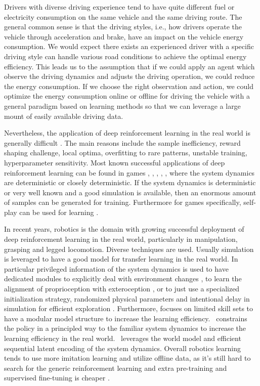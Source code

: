 \documentclass{article}
\begin{document}
Drivers with diverse driving experience tend to have quite different fuel or electricity consumption on the same vehicle and the same driving route. The general common sense is that the driving styles, i.e., how drivers operate the vehicle through acceleration and brake, have an impact on the vehicle energy consumption. We would expect there exists an experienced driver with a specific driving style can handle various road conditions to achieve the optimal energy efficiency. This leads us to the assumption that if we could apply an agent which observe the driving dynamics and adjusts the driving operation, we could reduce the energy consumption. If we choose the right observation and action, we could optimize the energy consumption online or offline for driving the vehicle with a general paradigm based on learning methods so that we can leverage a large mount of easily available driving data.

Nevertheless, the application of deep reinforcement learning in the real world is generally difficult \parencite{DulacArnold_2021_real_world_rl}. The main reasons include the sample inefficiency, reward shaping challenge, local optima, overfitting to rare patterns, unstable training, hyperparameter sensitivity. Most known successful applications of deep reinforcement learning can be found in games \parencite{mnih13:_playin_atari_deep_reinf_learn}, \parencite{DBLP:journals/nature/SilverHMGSDSAPL16}, \parencite{DBLP:conf/ijcai/BrownS17}, \parencite{openai19:_dota_large_scale_deep_reinf_learn}, \parencite{bakhtin22:_Human_level_diplomacy_cicero}, where the system dynamics are deterministic or closely deterministic.
If the system dynamics is deterministic or very well known and a good simulation is available, then an enormous amount of samples can be generated for training. Furthermore for games specifically, self-play can be used for learning \parencite{Silver_2018}.

In recent years, robotics is the domain with growing successful deployment of deep reinforcement learning in the real world, particularly in manipulation, grasping and legged locomotion. Diverse techniques are used. Usually simulation is leveraged to have a good model for transfer learning in the real world. In particular privileged information of the system dynamics is used to have dedicated modules to explicitly deal with environment changes \parencite{kumar21:_rma}, to learn the alignment of proprioception with exteroception \parencite{Miki_2022}, or to just use a specialized initialization strategy, randomized physical parameters and intentional delay in simulation for efficient exploration \parencite{Song_2023}. Furthermore, \parencite{Hoeller_2024} focuses on limited skill sets to have a modular model structure to increase the learning efficiency.\ \parencite{smith23:_grow_your_limit} constrains the policy in a principled way to the familiar system dynamics to increase the learning efficiency in the real world.\ \parencite{wu22:_daydr} leverages the world model and efficient sequential latent encoding of the system dynamics. Overall robotics learning tends to use more imitation learning and utilize offline data, as it's still hard to search for the generic reinforcement learning and extra pre-training and supervised fine-tuning is cheaper \parencite{Irpan_2024}.
\end{document}
